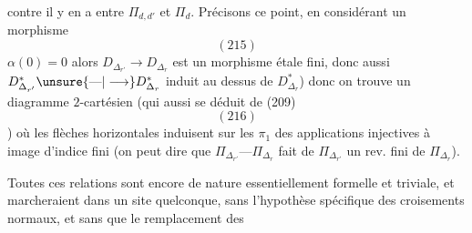 contre il y en a entre $\Pi_{d,d'}$ et $\Pi_d$.
Précisons ce point, en considérant un
morphisme
\[
(215)
\]
 $\alpha(0)=0$
alors $D_{\Delta_{r'}}\longrightarrow D_{\Delta_r}$ est un morphisme
étale fini, donc aussi $D^*_{\Delta_{r'}}\unsure{\text{---}|\longrightarrow}D^*_{\Delta_r}$ induit
au dessus de $D^*_{\Delta_r}$) donc on trouve
un diagramme $2$-cartésien (qui 
 aussi se déduit de (209)
\[
(216)
\]
)
où les flèches horizontales induisent sur
les $\pi_1$ des applications injectives à
image d'indice fini (on peut dire que
$\Pi_{\Delta_{r'}}\text{---}\Pi_{\Delta_r}$ fait de $\Pi_{\Delta_{r'}}$ un
rev. fini de $\Pi_{\Delta_r}$).

Toutes ces relations sont encore de
nature essentiellement formelle et triviale,
et marcheraient dans un site quelconque,
sans l'hypothèse spécifique des croisements
normaux, et sans que le remplacement des
